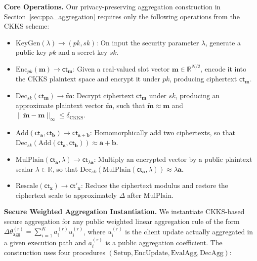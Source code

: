 \documentclass[journal]{IEEEtran}
\begin{document}
\textbf{Core Operations.}
Our privacy-preserving aggregation construction in Section~\ref{sec:ppa_aggregation}
requires only the following operations from the CKKS scheme:

\begin{itemize}
    \item $\mathrm{KeyGen}(\lambda) \rightarrow (pk,sk)$:
    On input the security parameter $\lambda$, generate a public key $pk$
    and a secret key $sk$.

    \item $\mathrm{Enc}_{pk}(\mathbf{m}) \rightarrow \mathsf{ct}_{\mathbf{m}}$:
    Given a real-valued slot vector
    $\mathbf{m}\in\mathbb{R}^{N/2}$, encode it into the CKKS plaintext space
    and encrypt it under $pk$, producing ciphertext
    $\mathsf{ct}_{\mathbf{m}}$.

    \item $\mathrm{Dec}_{sk}(\mathsf{ct}_{\mathbf{m}})
    \rightarrow \widetilde{\mathbf{m}}$:
    Decrypt ciphertext $\mathsf{ct}_{\mathbf{m}}$ under $sk$, producing an
    approximate plaintext vector $\widetilde{\mathbf{m}}$, such that
    $\widetilde{\mathbf{m}}\approx\mathbf{m}$ and $\|\widetilde{\mathbf{m}}-\mathbf{m}\|_{\infty}
    \leq \delta_{\mathrm{CKKS}}.$

    \item $\mathrm{Add}(\mathsf{ct}_{\mathbf{a}},
    \mathsf{ct}_{\mathbf{b}}) \rightarrow \mathsf{ct}_{\mathbf{a+b}}$:
    Homomorphically add two ciphertexts, so that
    $\mathrm{Dec}_{sk}\!\left(\mathrm{Add}(\mathsf{ct}_{\mathbf{a}},\mathsf{ct}_{\mathbf{b}})
    \right)\approx\mathbf{a}+\mathbf{b}.$

    \item $\mathrm{MulPlain}(\mathsf{ct}_{\mathbf{a}},\lambda)
    \rightarrow \mathsf{ct}_{\lambda\mathbf{a}}$:
    Multiply an encrypted vector by a public plaintext scalar
    $\lambda\in\mathbb{R}$, so that
    $\mathrm{Dec}_{sk}\!\left(\mathrm{MulPlain}(\mathsf{ct}_{\mathbf{a}},\lambda)\right)
    \approx\lambda\mathbf{a}.$

    \item $\mathrm{Rescale}(\mathsf{ct}_{\mathbf{x}})
    \rightarrow \mathsf{ct}'_{\mathbf{x}}$:
    Reduce the ciphertext modulus and restore the ciphertext scale to
    approximately $\Delta$ after $\mathrm{MulPlain}$.
\end{itemize}

\textbf{Secure Weighted Aggregation Instantiation.}
We instantiate CKKS-based secure aggregation for any public weighted linear
aggregation rule of the form
$\Delta\theta_{\mathrm{agg}}^{(r)}=\sum_{i=1}^{K} a_i^{(r)}u_i^{(r)}$,
where $u_i^{(r)}$ is the client update actually aggregated in a given
execution path and $a_i^{(r)}$ is a public aggregation coefficient.
The construction uses four procedures
$(\mathrm{Setup}, \mathrm{EncUpdate}, \mathrm{EvalAgg}, \mathrm{DecAgg})$:
\end{document}
